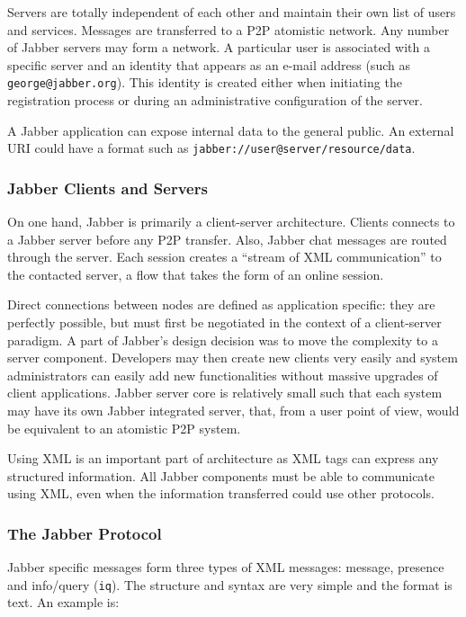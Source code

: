 Servers are totally independent of each other and maintain their own list of
users and services. Messages are transferred to a P2P atomistic network. Any
number of Jabber servers may form a network. A particular user is associated
with a specific server and an identity that appears as an e-mail address
(such as \texttt{george@jabber.org}). This identity is created either when
initiating the registration process or during an administrative configuration
of the server.

A Jabber application can expose internal data to the general public. An
external URI could have a format such as
\texttt{jabber://user@server/resource/data}.

\subsubsection{Jabber Clients and Servers}

On one hand, Jabber is primarily a client-server architecture. Clients
connects to a Jabber server before any P2P transfer. Also, Jabber chat
messages are routed through the server. Each session creates a ``stream of XML
communication'' to the contacted server, a flow that takes the form of an
online session.

Direct connections between nodes are defined as application specific: they are
perfectly possible, but must first be negotiated in the context of
a client-server paradigm. A part of Jabber's design decision was to move the
complexity to a server component. Developers may then create new clients very
easily and system administrators can easily add new functionalities without
massive upgrades of client applications. Jabber server core is relatively
small such that each system may have its own Jabber integrated server, that,
from a user point of view, would be equivalent to an atomistic P2P system.

Using XML is an important part of architecture as XML tags can express any
structured information. All Jabber components must be able to communicate using
XML, even when the information transferred could use other protocols.

\subsubsection{The Jabber Protocol}

Jabber specific messages form three types of XML messages: message, presence
and info/query (\texttt{iq}). The structure and syntax are very simple and the
format is text. An example is:

